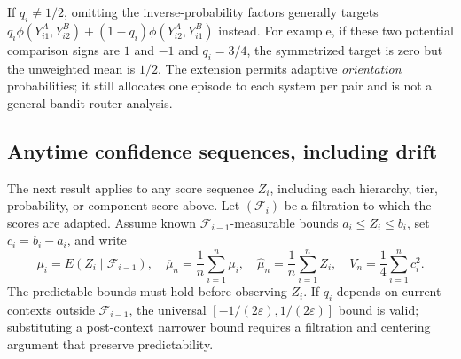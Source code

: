 If $q_i\ne1/2$, omitting the inverse-probability factors generally
targets $q_i\phi(Y_{i1}^A,Y_{i2}^B)
+(1-q_i)\phi(Y_{i2}^A,Y_{i1}^B)$ instead. For example, if these two
potential comparison signs are $1$ and $-1$ and $q_i=3/4$, the
symmetrized target is zero but the unweighted mean is $1/2$.
The extension permits adaptive \emph{orientation} probabilities; it
still allocates one episode to each system per pair and is not a general
bandit-router analysis.

\subsection{Anytime confidence sequences, including drift}

The next result applies to any score sequence $Z_i$, including each
hierarchy, tier, probability, or component score above. Let
$(\mathcal F_i)$ be a filtration to which the scores are adapted.
Assume known $\mathcal F_{i-1}$-measurable bounds
$a_i\leq Z_i\leq b_i$, set $c_i=b_i-a_i$, and write
\[
 \mu_i=E(Z_i\mid\mathcal F_{i-1}),\quad
 \overline\mu_n=\frac1n\sum_{i=1}^n\mu_i,\quad
 \widehat\mu_n=\frac1n\sum_{i=1}^n Z_i,\quad
 V_n=\frac14\sum_{i=1}^n c_i^2.
\]
The predictable bounds must hold before observing $Z_i$. If $q_i$ depends
on current contexts outside $\mathcal F_{i-1}$, the universal
$[-1/(2\varepsilon),1/(2\varepsilon)]$ bound is valid; substituting a
post-context narrower bound requires a filtration and centering
argument that preserve predictability.

